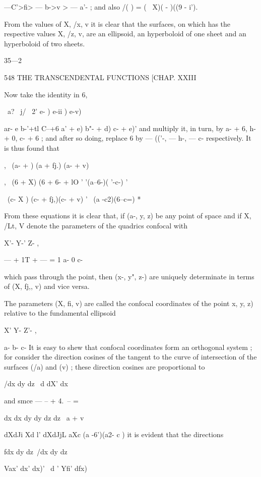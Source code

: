 {{ —C'>fi> — b->v > — a'- ; and also /( ) = ( \ X)( - )((9 - i').

From the values of X, /x, v it is clear that the surfaces, on which
has the respective values X, /z, v, are an ellipsoid, an hyperboloid
of one sheet and an hyperboloid of two sheets.

35—2



548 THE TRANSCENDENTAL FUNCTIONS [CHAP. XXIII

Now take the identity in 6,

\ a? \ j/ \ 2' e- ) e-ii ) e-v)

ar- e b-'+tl C--+6 a' + e) b"- + d) c- + e)' and multiply it, in turn,
by a- + 6, h- + 0, c- + 6 ; and after so doing, replace 6 by — (('-, —
h-, — c- respectively. It is thus found that

, \ (a- + ) (a + fj.) (a- + v)

, \ (6 + X) (6 + 6- + lO ' '(a--6-)( '-c-) '

  \ (c- X ) (c- + fj,)(c- + v) '~ (a -c2)(6--c=) *

From these equations it is clear that, if (a-, y, z) be any point of
space and if X, /Lt, V denote the parameters of the quadrics confocal
with

X'- Y-' Z- ,

— + 1T + — = 1 a- 0 c-

which pass through the point, then (x-, y", z-) are uniquely
determinate in terms of (X, fj,, v) and vice versa.

The parameters (X, fi, v) are called the confocal coordinates of the
point x, y, z) relative to the fundamental ellipsoid

X' Y- Z'- ,

a- b- c- It is easy to shew that confocal coordinates form an
orthogonal system ; for consider the direction cosines of the tangent
to the curve of intersection of the surfaces (/a) and (v) ; these
direction cosines are proportional to

/dx dy dz \ d dX' dx



and smce — -- + 4.\ -- = %



dx dx dy dy dz dz \ a + v

dXdJi Xd l' dXdJjL aXc (a -6')(a2- c ) it is evident that the
directions

fdx dy dz\ /dx dy dz\

Vax' dx' dx)' \ d ' Yfi' dfx)

}}
